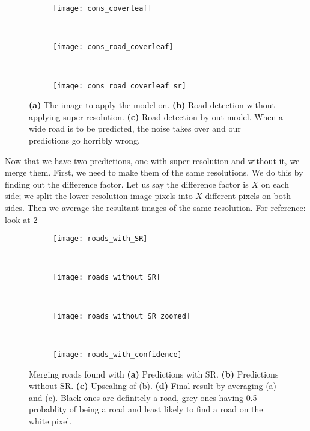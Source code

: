 \begin{figure}[h!]
  \centering
  \begin{subfigure}{0.3\textwidth}
    \texttt{[image: cons\_coverleaf]}
    \caption{}
  \end{subfigure}~
  \begin{subfigure}{0.3\textwidth}
    \texttt{[image: cons\_road\_coverleaf]}
    \caption{}
  \end{subfigure}~
  \begin{subfigure}{0.3\textwidth}
    \texttt{[image: cons\_road\_coverleaf\_sr]}
    \caption{}
  \end{subfigure}
  \caption[Problem in predictions large roads]{\textbf{(a)} The image to apply the model on. \textbf{(b)} Road detection without applying super-resolution. \textbf{(c)} Road detection by out model. When a wide road is to be predicted, the noise takes over and our predictions go horribly wrong.}
  \label{fig:cons_coverleaf}
\end{figure}

Now that we have two predictions, one with super-resolution and without it, we merge them. First, we need to make them of the same resolutions. We do this by finding out the difference factor. Let us say the difference factor is $X$ on each side; we split the lower resolution image pixels into $X$ different pixels on both sides. Then we average the resultant images of the same resolution. For reference: look at \cref{fig:roads_in_confidence}

\begin{figure}[h!]
  \begin{subfigure}[b]{0.25\textwidth}
    \texttt{[image: roads\_with\_SR]}
    \caption{}
  \end{subfigure}~
  \begin{subfigure}[b]{0.15\textwidth}
    \texttt{[image: roads\_without\_SR]}
    \caption{}
  \end{subfigure}~
  \begin{subfigure}[b]{0.25\textwidth}
    \texttt{[image: roads\_without\_SR\_zoomed]}
    \caption{}
  \end{subfigure}~
  \begin{subfigure}[b]{0.25\textwidth}
    \texttt{[image: roads\_with\_confidence]}
    \caption{}
  \end{subfigure}
  \caption[Finding likelihood of roads in predictions]{Merging roads found with \textbf{(a)} Predictions with SR. \textbf{(b)} Predictions without SR. \textbf{(c)} Upscaling of (b). \textbf{(d)} Final result by averaging (a) and (c). Black ones are definitely a road, grey ones having 0.5 probablity of being a road and least likely to find a road on the white pixel.}
  \label{fig:roads_in_confidence}
\end{figure}

